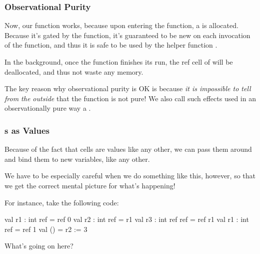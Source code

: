 \documentclass[aspectratio=169, handout]{beamer}
\begin{document}
\begin{frame}[fragile]
  \frametitle{Observational Purity}

  \ptmt

  Now, our  function works, because upon entering the function, a
   is allocated. Because it's gated by the function, it's guaranteed
  to be new on each invocation of the function, and thus it is
  safe to be used by the helper function .

  \pause
  \vspace{\fill}

  In the background, once the  function finishes its run, the ref
  cell of  will be deallocated, and thus not waste any memory.

  \pause
  \vspace{\fill}


  \pause
  \vspace{\fill}

  The key reason why observational purity is OK is because \textit{it is impossible
  to tell from the outside} that the function is not pure! We also call such
  effects used in an observationally pure way a .
\end{frame}


\begin{frame}[fragile]
  \frametitle{s as Values}

  Because of the fact that  cells are values like any other, we can
  pass them around and bind them to new variables, like any other.

  \pause
  \vspace{\fill}

  We have to be especially careful when we do something like this, however,
  so that we get the correct mental picture for what's happening!

  \pause
  \vspace{\fill}

  For instance, take the following code:

  \begin{codeblock}
    val r1 : int ref     = ref 0
    val r2 : int ref     = r1
    val r3 : int ref ref = ref r1
    val r1 : int ref     = ref 1
    val ()               = r2 := 3
  \end{codeblock}

  \pause
  \vspace{\fill}

  What's going on here?
\end{frame}
\end{document}
